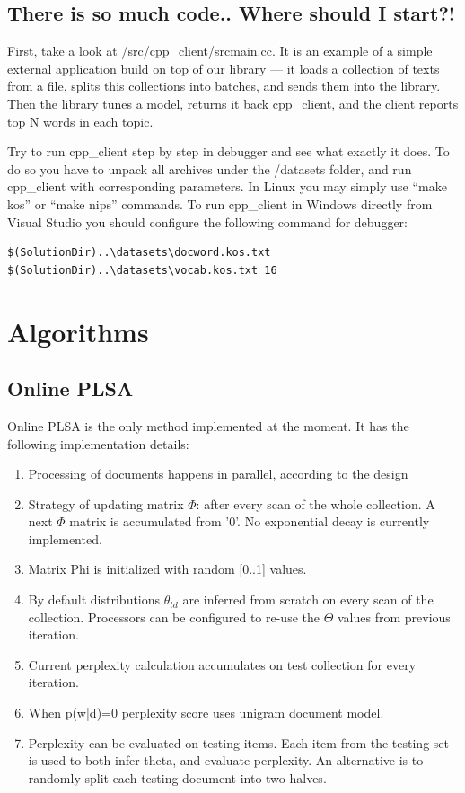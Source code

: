 \documentclass[11pt,a4paper,twoside]{report}
\begin{document}
\subsection{There is so much code.. Where should I start?!}

First, take a look at /src/cpp\_client/srcmain.cc.
It is an example of a simple external application build on top of our library ---
it loads a collection of texts from a file,
splits this collections into batches, and sends them into the library.
Then the library tunes a model,
returns it back cpp\_client,
and the client reports top N words in each topic.

Try to run cpp\_client step by step in debugger and see what exactly it does.
To do so you have to unpack all archives under the /datasets folder,
and run cpp\_client with corresponding parameters.
In Linux you may simply use ``make kos'' or ``make nips'' commands.
To run cpp\_client in Windows directly from Visual Studio
you should configure the following command for debugger:

{\small
\begin{verbatim}
$(SolutionDir)..\datasets\docword.kos.txt $(SolutionDir)..\datasets\vocab.kos.txt 16
\end{verbatim}}

\section{Algorithms}

\subsection{Online PLSA}
Online PLSA is the only method implemented at the moment.
It has the following implementation details:
\begin{enumerate}
    \item Processing of documents happens in parallel, according to the design
    \item Strategy of updating matrix $\Phi$: after every scan of the whole collection.
          A next $\Phi$ matrix is accumulated from '0'.
          No exponential decay is currently implemented.
    \item Matrix Phi is initialized with random [0..1] values.
    \item By default distributions $\theta_{t d}$ are inferred from scratch on every scan of the collection.
          Processors can be configured to re-use the $\Theta$ values from previous iteration.
    \item Current perplexity calculation accumulates on test collection for every iteration.
    \item When p(w|d)=0 perplexity score uses unigram document model.
    \item Perplexity can be evaluated on testing items.
          Each item from the testing set is used to both infer theta, and evaluate perplexity.
          An alternative is to randomly split each testing document into two halves.
\end{enumerate}
\end{document}
